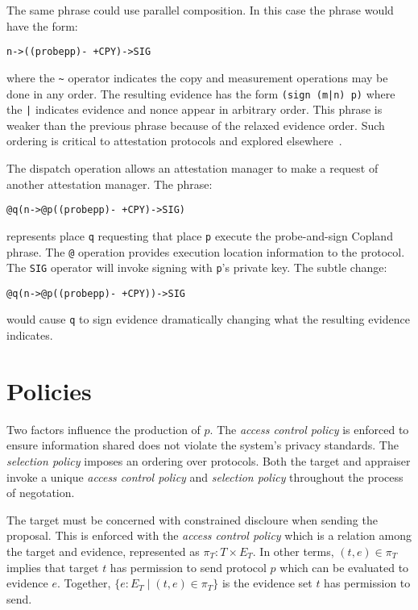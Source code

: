 \documentclass[sigconf,authordraft]{acmart}
\begin{document}
The same phrase could use parallel composition.  In this case the
phrase would have the form:

\begin{alltt}
  n -> ((probe p p) -~+ CPY) -> SIG
\end{alltt}

\noindent where the \verb+~+ operator indicates the copy and
measurement operations may be done in any order.  The resulting
evidence has the form \verb+(sign (m|n) p)+ where the \verb+|+
indicates evidence and nonce appear in arbitrary order.  This phrase
is weaker than the previous phrase because of the relaxed evidence
order.  Such ordering is critical to attestation protocols and
explored elsewhere~\cite{Rowe:2016bi}.

The dispatch operation allows an attestation manager to make a request
of another attestation manager.  The phrase:

\begin{alltt}
  @q(n -> @p((probe p p) -~+ CPY) -> SIG)
\end{alltt}

\noindent represents place \verb+q+ requesting that place \verb+p+
execute the probe-and-sign Copland phrase.  The \verb+@+ operation
provides execution location information to the protocol.  The
\verb+SIG+ operator will invoke signing with \verb+p+'s private
key. The subtle change:

\begin{alltt}
  @q(n -> @p((probe p p) -~+ CPY)) -> SIG
\end{alltt}

\noindent would cause \verb+q+ to sign evidence dramatically changing
what the resulting evidence indicates.

\section{Policies}

Two factors influence the production of $p$. The \emph{access control policy} is enforced to ensure information shared does not violate the system's privacy standards. The  \emph{selection policy} imposes an ordering over protocols. Both the target and appraiser invoke a unique \emph{access control policy} and \emph{selection policy} throughout the process of negotation.  

The target must be concerned with constrained discloure when sending the proposal. This is enforced with the \emph{access control policy} which is a relation among the target and evidence, represented as  $\pi_T : T\times E_T$. In other terms, $(t,e)\in\pi_T$ implies that target $t$ has permission to send protocol $p$ which can be evaluated to evidence $e$. Together, $\{e:E_T\mid (t,e)\in\pi_T\}$ is the evidence set $t$ has permission to send.
\end{document}
